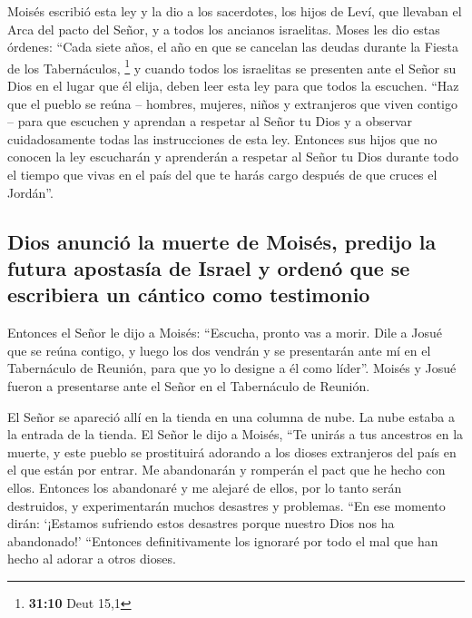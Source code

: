  Moisés escribió esta ley y la dio a los sacerdotes, los
hijos de Leví, que llevaban el Arca del pacto del Señor, y a todos los
ancianos israelitas.  Moses les dio estas órdenes: ``Cada
siete años, el año en que se cancelan las deudas durante la Fiesta de
los Tabernáculos, \footnote{\textbf{31:10} Deut 15,1}  y
cuando todos los israelitas se presenten ante el Señor su Dios en el
lugar que él elija, deben leer esta ley para que todos la escuchen.
 ``Haz que el pueblo se reúna -- hombres, mujeres, niños
y extranjeros que viven contigo -- para que escuchen y aprendan a
respetar al Señor tu Dios y a observar cuidadosamente todas las
instrucciones de esta ley.  Entonces sus hijos que no
conocen la ley escucharán y aprenderán a respetar al Señor tu Dios
durante todo el tiempo que vivas en el país del que te harás cargo
después de que cruces el Jordán''.

\hypertarget{dios-anunciuxf3-la-muerte-de-moisuxe9s-predijo-la-futura-apostasuxeda-de-israel-y-ordenuxf3-que-se-escribiera-un-cuxe1ntico-como-testimonio}{%
\subsection{Dios anunció la muerte de Moisés, predijo la futura
apostasía de Israel y ordenó que se escribiera un cántico como
testimonio}\label{dios-anunciuxf3-la-muerte-de-moisuxe9s-predijo-la-futura-apostasuxeda-de-israel-y-ordenuxf3-que-se-escribiera-un-cuxe1ntico-como-testimonio}}

 Entonces el Señor le dijo a Moisés: ``Escucha, pronto
vas a morir. Dile a Josué que se reúna contigo, y luego los dos vendrán
y se presentarán ante mí en el Tabernáculo de Reunión, para que yo lo
designe a él como líder''. Moisés y Josué fueron a presentarse ante el
Señor en el Tabernáculo de Reunión.

 El Señor se apareció allí en la tienda en una columna de
nube. La nube estaba a la entrada de la tienda.  El Señor
le dijo a Moisés, ``Te unirás a tus ancestros en la muerte, y este
pueblo se prostituirá adorando a los dioses extranjeros del país en el
que están por entrar. Me abandonarán y romperán el pact que he hecho con
ellos.  Entonces los abandonaré y me alejaré de ellos,
por lo tanto serán destruidos, y experimentarán muchos desastres y
problemas. ``En ese momento dirán: `¡Estamos sufriendo estos desastres
porque nuestro Dios nos ha abandonado!'  ``Entonces
definitivamente los ignoraré por todo el mal que han hecho al adorar a
otros dioses.

